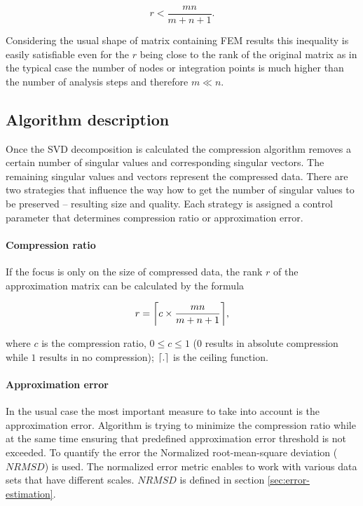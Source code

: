 \begin{equation}
r<\frac{m n}{m+n+1}.
\label{eq:r-ineq}
\end{equation}

\noindent
Considering the usual shape of matrix containing FEM results this inequality is easily satisfiable even for the $r$ being close to the rank of the original matrix as in the typical case the number of nodes or integration points is much higher than the number of analysis steps and therefore $m \ll n$.


\subsection{Algorithm description}
Once the SVD decomposition is calculated the compression algorithm removes a certain number of singular values and corresponding singular vectors. The remaining singular values and vectors represent the compressed data. There are two strategies that influence the way how to get the number of singular values to be preserved -- resulting size and quality. Each strategy is assigned a control parameter that determines compression ratio or approximation error.

\paragraph{Compression ratio}
If the focus is only on the size of compressed data, the rank $r$ of the approximation matrix can be calculated by the formula

\begin{equation}
r=\ceil*{c \times \frac{m n}{m+n+1}},
\label{eq:rank-from-comp-ratio}
\end{equation}

\noindent
where $c$ is the compression ratio, $0 \leq c \leq 1$ ($0$ results in absolute compression while $1$ results in no compression); $\ceil*{.}$ is the ceiling function.

\paragraph{Approximation error}
In the usual case the most important measure to take into account is the approximation error. Algorithm is trying to minimize the compression ratio while at the same time ensuring that predefined approximation error threshold is not exceeded. To quantify the error the Normalized root-mean-square deviation ($\mathit{NRMSD}$) is used. The normalized error metric enables to work with various data sets that have different scales. $\mathit{NRMSD}$ is defined in section \ref{sec:error-estimation}.

